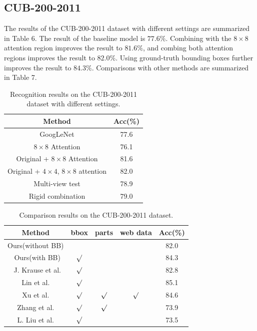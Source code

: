 \documentclass[10pt,twocolumn,letterpaper]{article}
\begin{document}
\subsection{CUB-200-2011}
The results of the CUB-200-2011 dataset with different settings are summarized in Table 6.
 The result of the baseline model is $77.6\%$.
 Combining with the $8\times8$ attention region improves the result to $81.6\%$, and combing both attention regions improves the result to $82.0\%$.
 Using ground-truth bounding boxes further improves the result to $84.3\%$. Comparisons with other methods are summarized in Table 7.

\begin{table}[htb]
\begin{center}
\begin{tabular}
{c|c}\hline
Method &   Acc(\%) \\\hline\hline
GoogLeNet  & 77.6 \\
$8\times8$ Attention  & 76.1 \\
Original + $8\times8$ Attention & 81.6 \\
Original + $4\times4$, $8\times8$ attention & 82.0 \\
Multi-view test  & 78.9 \\
Rigid combination & 79.0 \\\hline
\end{tabular}
\caption{Recognition results on the CUB-200-2011 dataset with different settings.}
\end{center}
\end{table}

\begin{table}[htb]
\begin{center}
\begin{tabular}
{c||c|c|c|c}\hline
Method &  bbox & parts & web data & Acc(\%) \\\hline\hline
Ours(without BB) &  &   &   &82.0 \\\
Ours(with BB) & $\surd$ & &   & 84.3 \\\
J. Krause et al. \cite{bd22} &  $\surd$ &  &  & 82.8 \\
Lin et al. \cite{bd16} & $\surd$ &    &   & 85.1 \\
Xu et al. \cite{bd23} & $\surd$ & $\surd$ & $\surd$ & 84.6 \\
Zhang et al. \cite{bd11} & $\surd$ & $\surd$ &   & 73.9 \\
L. Liu et al. \cite{bd26}     & $\surd$ &   &   & 73.5 \\                \hline
\end{tabular}
\caption{Comparison results on the CUB-200-2011 dataset.}
\end{center}
\end{table}
\end{document}
